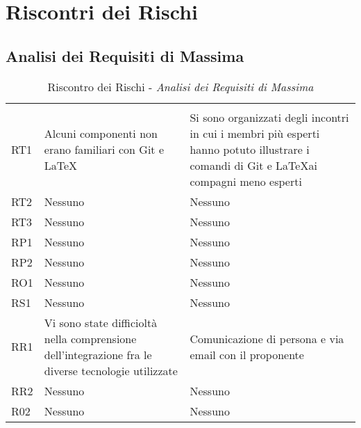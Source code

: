 \appendix
\section{Riscontri dei Rischi}
\subsection{Analisi dei Requisiti di Massima}
\begin{table}[H]
	\centering
	\begin{tabular}{|C{2.5cm}|C{5cm}|C{5cm}|}
		 & & \\
		RT1  & Alcuni componenti non erano familiari con Git e \LaTeX & Si sono organizzati degli incontri in cui i membri più esperti hanno potuto illustrare i comandi di Git e \LaTeX ai compagni meno esperti \\
		\hline
		RT2  & Nessuno & Nessuno \\
		\hline
		RT3  & Nessuno & Nessuno \\
		\hline
		RP1  & Nessuno & Nessuno \\
		\hline
		RP2  & Nessuno & Nessuno \\
		\hline
		RO1  & Nessuno & Nessuno \\
		\hline
		RS1  & Nessuno & Nessuno \\
		\hline
		RR1  & Vi sono state difficioltà nella comprensione dell'integrazione fra le diverse tecnologie utilizzate & Comunicazione di persona e via email con il proponente \\
		\hline
		RR2  & Nessuno & Nessuno \\
		\hline
		R02  & Nessuno & Nessuno \\
		\hline
	\end{tabular}
	\caption{Riscontro dei Rischi - \textit{Analisi dei Requisiti di Massima}}
\end{table}

